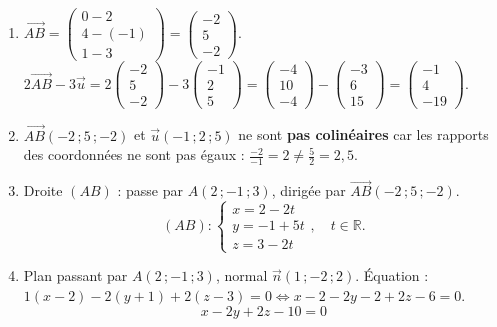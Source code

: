 \documentclass[11pt]{article}
\begin{document}
\begin{corrige}
\begin{enumerate}
\item $\overrightarrow{AB} = \begin{pmatrix}0-2 \\ 4-(-1) \\ 1-3\end{pmatrix} = \begin{pmatrix}-2 \\ 5 \\ -2\end{pmatrix}$.\\
$2\overrightarrow{AB} - 3\vec{u} = 2\begin{pmatrix}-2 \\ 5 \\ -2\end{pmatrix} - 3\begin{pmatrix}-1 \\ 2 \\ 5\end{pmatrix} = \begin{pmatrix}-4 \\ 10 \\ -4\end{pmatrix} - \begin{pmatrix}-3 \\ 6 \\ 15\end{pmatrix} = \begin{pmatrix}-1 \\ 4 \\ -19\end{pmatrix}$.

\item $\overrightarrow{AB}(-2\,;5\,;-2)$ et $\vec{u}(-1\,;2\,;5)$ ne sont \textbf{pas colinéaires} car les rapports des coordonnées ne sont pas égaux : $\frac{-2}{-1}=2 \neq \frac{5}{2}=2,5$.

\item Droite $(AB)$ : passe par $A(2\,;-1\,;3)$, dirigée par $\overrightarrow{AB}(-2\,;5\,;-2)$.
\[
(AB) : \begin{cases} x = 2 - 2t \\ y = -1 + 5t \\ z = 3 - 2t \end{cases},\quad t\in\mathbb{R}.
\]

\item Plan passant par $A(2\,;-1\,;3)$, normal $\vec{n}(1\,;-2\,;2)$.
Équation : $1(x-2) - 2(y+1) + 2(z-3) = 0 \iff x - 2 - 2y - 2 + 2z - 6 = 0$.
\[
\boxed{x - 2y + 2z - 10 = 0}
\]
\end{enumerate}
\end{corrige}
\end{document}
